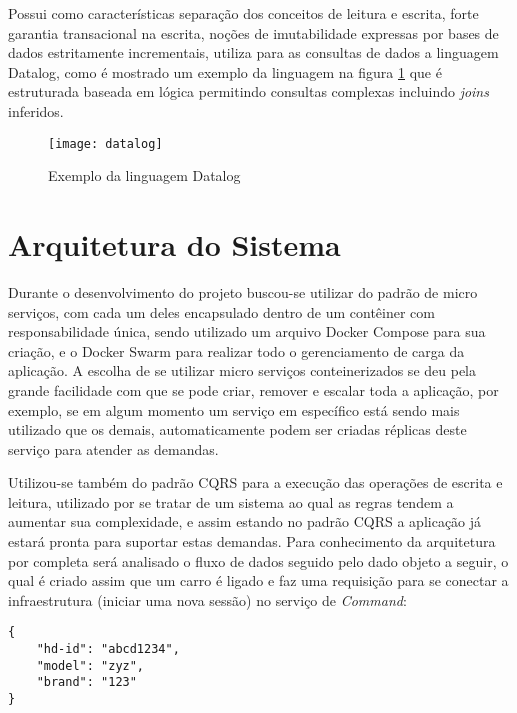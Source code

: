Possui como características separação dos conceitos de leitura e escrita, forte garantia transacional na escrita, noções de imutabilidade expressas por bases de dados estritamente incrementais, utiliza para as consultas de dados a linguagem Datalog, como é mostrado um exemplo da linguagem na figura \ref{fig:datalog} que é estruturada baseada em lógica permitindo consultas complexas incluindo \textit{joins} inferidos.~\cite{datomic} 

\begin{figure}[!h]
\caption{\label{fig:datalog} Exemplo da linguagem Datalog}
\begin{center}
\texttt{[image: datalog]}
\end{center}
\end{figure}

\section{Arquitetura do Sistema}
Durante o desenvolvimento do projeto buscou-se utilizar do padrão de micro serviços, com cada um deles encapsulado dentro de um contêiner com responsabilidade única, sendo utilizado um arquivo Docker Compose para sua criação, e o Docker Swarm para realizar todo o gerenciamento de carga da aplicação. A escolha de se utilizar micro serviços conteinerizados se deu pela grande facilidade com que se pode criar, remover e escalar toda a aplicação, por exemplo, se em algum momento um serviço em específico está sendo mais utilizado que os demais, automaticamente podem ser criadas réplicas deste serviço para atender as demandas.~\cite{dockerswarm}

Utilizou-se também do padrão CQRS para a execução das operações de escrita e leitura, utilizado por se tratar de um sistema ao qual as regras tendem a aumentar sua complexidade, e assim estando no padrão CQRS a aplicação já estará pronta para suportar estas demandas. Para conhecimento da arquitetura por completa será analisado o fluxo de dados seguido pelo dado objeto a seguir, o qual é criado assim que um carro é ligado e faz uma requisição para se conectar a infraestrutura (iniciar uma nova sessão) no serviço de \textit{Command}:
\begin{lstlisting}
{
	"hd-id": "abcd1234",
	"model": "zyz",
	"brand": "123"
}
\end{lstlisting}

